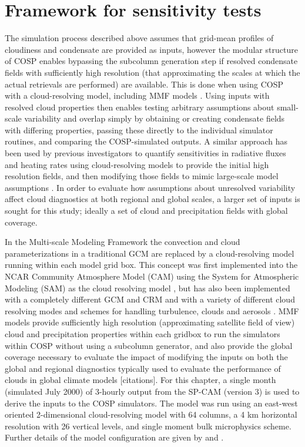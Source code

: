 \section{Framework for sensitivity tests}\label{section_subgrid_framework}
The simulation process described above assumes that grid-mean profiles of cloudiness and condensate are provided as inputs, however the modular structure of COSP enables bypassing the subcolumn generation step if resolved condensate fields with sufficiently high resolution (that approximating the scales at which the actual retrievals are performed) are available. This is done when using COSP with a cloud-resolving model, including MMF models \citep[e.g.,][]{marchand_et_al_2009, marchand_and_ackerman_2010}. Using inputs with resolved cloud properties then enables testing arbitrary assumptions about small-scale variability and overlap simply by obtaining or creating condensate fields with differing properties, passing these directly to the individual simulator routines, and comparing the COSP-simulated outputs. A similar approach has been used by previous investigators to quantify sensitivities in radiative fluxes and heating rates using cloud-resolving models to provide the initial high resolution fields, and then modifying those fields to mimic large-scale model assumptions \citep[e.g.,][]{barker_et_al_1999}. In order to evaluate how assumptions about unresolved variability affect cloud diagnostics at both regional and global scales, a larger set of inputs is sought for this study; ideally a set of cloud and precipitation fields with global coverage.

In the Multi-scale Modeling Framework \citep[MMF;][]{randall_et_al_2003} the convection and cloud parameterizations in a traditional GCM are replaced by a cloud-resolving model running within each model grid box. This concept was first implemented into the NCAR Community Atmosphere Model (CAM) using the System for Atmospheric Modeling (SAM) as the cloud resolving model \citep[SP-CAM;][]{khairoutdinov_and_randall_2001}, but has also been implemented with a completely different GCM and CRM \citep{tao_et_al_2009} and with a variety of different cloud resolving modes and schemes for handling turbulence, clouds and aerosols \citep[e.g.,][]{cheng_and_xu_2011, cheng_and_xu_2013}. MMF models provide sufficiently high resolution (approximating satellite field of view) cloud and precipitation properties within each gridbox to run the simulators within COSP without using a subcolumn generator, and also provide the global coverage necessary to evaluate the impact of modifying the inputs on both the global and regional diagnostics typically used to evaluate the performance of clouds in global climate models [citations].  For this chapter, a single month (simulated July 2000) of 3-hourly output from the SP-CAM (version 3) is used to derive the inputs to the COSP simulators. The model was run using an east-west oriented 2-dimensional cloud-resolving model with 64 columns, a 4 km horizontal resolution with 26 vertical levels, and single moment bulk microphysics scheme.  Further details of the model configuration are given by \cite{khairoutdinov_et_al_2005} and \cite{marchand_et_al_2009}.

